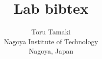 \documentclass[10pt,twocolumn,letterpaper]{article}
\begin{document}
\title{Lab bibtex}

\author{
Toru Tamaki\\
Nagoya Institute of Technology\\
Nagoya, Japan
}
\maketitle


\nocite{*}


{\small

% 

}
\end{document}
